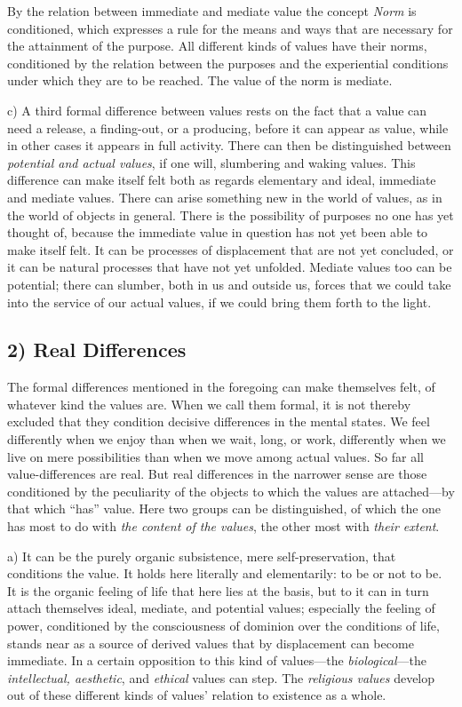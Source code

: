 \documentclass[12pt,a4paper]{book}
\newcommand{\opage}[1]{\marginnote{\footnotesize\textit{[#1]}}}
\begin{document}
By the relation between immediate and mediate value the concept \emph{Norm} is
conditioned, which expresses a rule for the means and ways that are necessary
for the attainment of the purpose. All different kinds of values have their
norms, \opage{243}conditioned by the relation between the purposes and the experiential
conditions under which they are to be reached. The value of the norm is
mediate.

c) A third formal difference between values rests on the fact that a value can
need a release, a finding-out, or a producing, before it can appear as value,
while in other cases it appears in full activity. There can then be
distinguished between \emph{potential and actual values}, if one will,
slumbering and waking values. This difference can make itself felt both as
regards elementary and ideal, immediate and mediate values. There can arise
something new in the world of values, as in the world of objects in general.
There is the possibility of purposes no one has yet thought of, because the
immediate value in question has not yet been able to make itself felt. It can
be processes of displacement that are not yet concluded, or it can be natural
processes that have not yet unfolded. Mediate values too can be potential;
there can slumber, both in us and outside us, forces that we could take into
the service of our actual values, if we could bring them forth to the light.

\subsection*{2) Real Differences}

The formal differences mentioned in the foregoing can make themselves felt,
of whatever kind the values are. When we call them formal, it is not thereby
excluded that they condition decisive differences in the mental states. We
feel differently when we enjoy than when we wait, long, or work, differently
when we live on mere possibilities than when we move among actual values. So
far all value-differences are real. But real differences in the narrower
sense are those conditioned by the peculiarity of the objects to which the
values are attached---by that which ``has'' value. Here two groups can be
distinguished, of which the one has most to do with \emph{the content of the
values}, the other most with \emph{their extent}.

\opage{244}a) It can be the purely organic subsistence, mere self-preservation, that
conditions the value. It holds here literally and elementarily: to be or not
to be. It is the organic feeling of life that here lies at the basis, but to
it can in turn attach themselves ideal, mediate, and potential values;
especially the feeling of power, conditioned by the consciousness of dominion
over the conditions of life, stands near as a source of derived values that by
displacement can become immediate. In a certain opposition to this kind of
values---the \emph{biological}---the \emph{intellectual, aesthetic}, and \emph{ethical} values can step. The \emph{religious values} develop out of these
different kinds of values' relation to existence as a whole.
\end{document}
